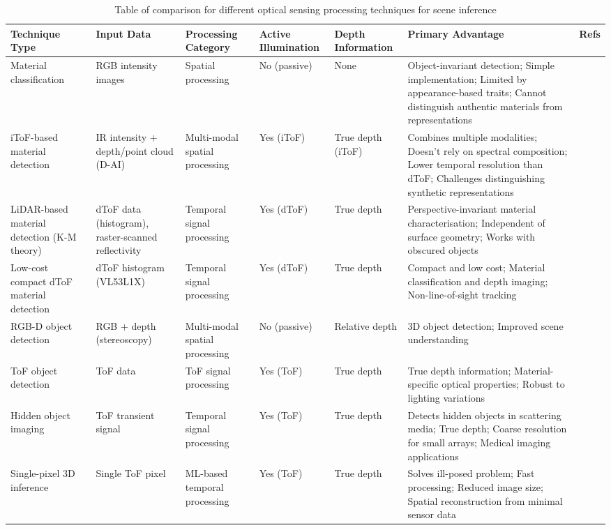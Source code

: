 \documentclass[12pt,a4paper,oneside]{report}
\begin{document}
\newpage
\begin{table}
\centering
\footnotesize
\begin{tabularx}{\textwidth}{p{2.2cm}Xp{2.5cm}p{2cm}p{2cm}Xp{0.3cm}}
\toprule
\textbf{Technique Type} & \textbf{Input Data} & \textbf{Processing Category} & \textbf{Active Illumination} & \textbf{Depth Information} & \textbf{Primary Advantage} & \textbf{Refs} \\
\midrule
Material classification & RGB intensity images & Spatial processing & No (passive) & None & Object-invariant detection; Simple implementation; Limited by appearance-based traits; Cannot distinguish authentic materials from representations & \cite{schwartz2013,sharan2013,depthpro2024} \\
\midrule
iToF-based material detection & IR intensity + depth/point cloud (D-AI) & Multi-modal spatial processing & Yes (iToF) & True depth (iToF) & Combines multiple modalities; Doesn't rely on spectral composition; Lower temporal resolution than dToF; Challenges distinguishing synthetic representations & \cite{sharma2023} \\
\midrule
LiDAR-based material detection (K-M theory) & dToF data (histogram), raster-scanned reflectivity & Temporal signal processing & Yes (dToF) & True depth & Perspective-invariant material characterisation; Independent of surface geometry; Works with obscured objects & \cite{yang2024} \\
\midrule
Low-cost compact dToF material detection & dToF histogram (VL53L1X) & Temporal signal processing & Yes (dToF) & True depth & Compact and low cost; Material classification and depth imaging; Non-line-of-sight tracking & \cite{callenberg2021} \\
\midrule
RGB-D object detection & RGB + depth (stereoscopy) & Multi-modal spatial processing & No (passive) & Relative depth & 3D object detection; Improved scene understanding & \cite{chen2024} \\
\midrule
ToF object detection & ToF data & ToF signal processing & Yes (ToF) & True depth & True depth information; Material-specific optical properties; Robust to lighting variations & \cite{tafone2023,fasolino2024,yang2023} \\
\midrule
Hidden object imaging & ToF transient signal & Temporal signal processing & Yes (ToF) & True depth & Detects hidden objects in scattering media; True depth; Coarse resolution for small arrays; Medical imaging applications & \cite{lyons2019} \\
\midrule
Single-pixel 3D inference & Single ToF pixel & ML-based temporal processing & Yes (ToF) & True depth & Solves ill-posed problem; Fast processing; Reduced image size; Spatial reconstruction from minimal sensor data & \cite{turpin2019,jungerman2022} \\
\bottomrule
\end{tabularx}
\caption{Table of comparison for different optical sensing processing techniques for scene inference}
\label{tab:2_1}
\end{table}
\end{document}
